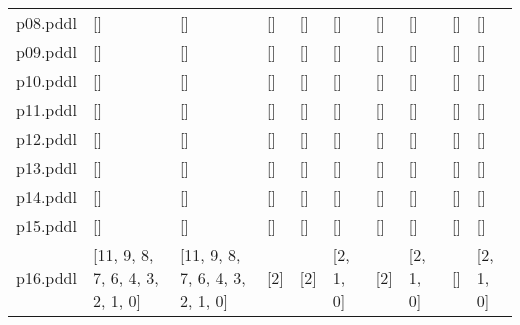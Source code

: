 \documentclass{article}
\begin{document}
\begin{tabular}{@{}lrrrrrrrrr@{}}
p08.pddl & \multicolumn{1}{|l|}{[]} & \multicolumn{1}{|l|}{[]} & \multicolumn{1}{|l|}{[]} & \multicolumn{1}{|l|}{[]} & \multicolumn{1}{|l|}{[]} & \multicolumn{1}{|l|}{[]} & \multicolumn{1}{|l|}{[]} & \multicolumn{1}{|l|}{[]} & \multicolumn{1}{|l|}{[]} \\
p09.pddl & \multicolumn{1}{|l|}{[]} & \multicolumn{1}{|l|}{[]} & \multicolumn{1}{|l|}{[]} & \multicolumn{1}{|l|}{[]} & \multicolumn{1}{|l|}{[]} & \multicolumn{1}{|l|}{[]} & \multicolumn{1}{|l|}{[]} & \multicolumn{1}{|l|}{[]} & \multicolumn{1}{|l|}{[]} \\
p10.pddl & \multicolumn{1}{|l|}{[]} & \multicolumn{1}{|l|}{[]} & \multicolumn{1}{|l|}{[]} & \multicolumn{1}{|l|}{[]} & \multicolumn{1}{|l|}{[]} & \multicolumn{1}{|l|}{[]} & \multicolumn{1}{|l|}{[]} & \multicolumn{1}{|l|}{[]} & \multicolumn{1}{|l|}{[]} \\
p11.pddl & \multicolumn{1}{|l|}{[]} & \multicolumn{1}{|l|}{[]} & \multicolumn{1}{|l|}{[]} & \multicolumn{1}{|l|}{[]} & \multicolumn{1}{|l|}{[]} & \multicolumn{1}{|l|}{[]} & \multicolumn{1}{|l|}{[]} & \multicolumn{1}{|l|}{[]} & \multicolumn{1}{|l|}{[]} \\
p12.pddl & \multicolumn{1}{|l|}{[]} & \multicolumn{1}{|l|}{[]} & \multicolumn{1}{|l|}{[]} & \multicolumn{1}{|l|}{[]} & \multicolumn{1}{|l|}{[]} & \multicolumn{1}{|l|}{[]} & \multicolumn{1}{|l|}{[]} & \multicolumn{1}{|l|}{[]} & \multicolumn{1}{|l|}{[]} \\
p13.pddl & \multicolumn{1}{|l|}{[]} & \multicolumn{1}{|l|}{[]} & \multicolumn{1}{|l|}{[]} & \multicolumn{1}{|l|}{[]} & \multicolumn{1}{|l|}{[]} & \multicolumn{1}{|l|}{[]} & \multicolumn{1}{|l|}{[]} & \multicolumn{1}{|l|}{[]} & \multicolumn{1}{|l|}{[]} \\
p14.pddl & \multicolumn{1}{|l|}{[]} & \multicolumn{1}{|l|}{[]} & \multicolumn{1}{|l|}{[]} & \multicolumn{1}{|l|}{[]} & \multicolumn{1}{|l|}{[]} & \multicolumn{1}{|l|}{[]} & \multicolumn{1}{|l|}{[]} & \multicolumn{1}{|l|}{[]} & \multicolumn{1}{|l|}{[]} \\
p15.pddl & \multicolumn{1}{|l|}{[]} & \multicolumn{1}{|l|}{[]} & \multicolumn{1}{|l|}{[]} & \multicolumn{1}{|l|}{[]} & \multicolumn{1}{|l|}{[]} & \multicolumn{1}{|l|}{[]} & \multicolumn{1}{|l|}{[]} & \multicolumn{1}{|l|}{[]} & \multicolumn{1}{|l|}{[]} \\
p16.pddl & \multicolumn{1}{|l|}{[11, 9, 8, 7, 6, 4, 3, 2, 1, 0]} & \multicolumn{1}{|l|}{[11, 9, 8, 7, 6, 4, 3, 2, 1, 0]} & \multicolumn{1}{|l|}{[2]} & \multicolumn{1}{|l|}{[2]} & \multicolumn{1}{|l|}{[2, 1, 0]} & \multicolumn{1}{|l|}{[2]} & \multicolumn{1}{|l|}{[2, 1, 0]} & \multicolumn{1}{|l|}{[]} & \multicolumn{1}{|l|}{[2, 1, 0]} \\

\end{tabular}
\end{document}
